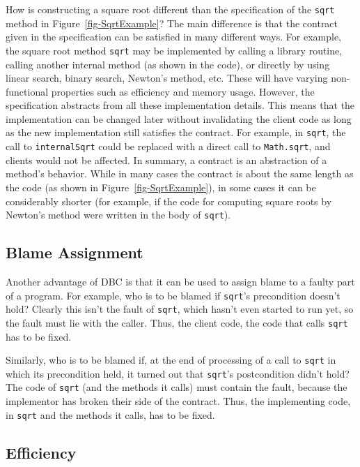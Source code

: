 \documentclass{jotarticle}
\begin{document}

How is constructing a square root different than the specification of
the \texttt{sqrt} method in Figure~\ref{fig-SqrtExample}?
The main difference is that the contract given in the specification
can be satisfied in many different ways. 
For example, the square root method \texttt{sqrt} may be implemented
by calling a library routine, calling another internal method
(as shown in the code), or directly by using linear search, binary
search, Newton's method, etc.  These will have varying non-functional
properties such as efficiency and memory usage.  However, the
specification abstracts from all these 
implementation details. This means that the implementation can
be changed later without invalidating the client code as long as the new
implementation still satisfies the contract.  For example, in
\texttt{sqrt}, the call to \texttt{internalSqrt} could be replaced
with a direct call to \texttt{Math.sqrt}, and clients would not be
affected. In summary, a contract
is an abstraction of a method's behavior.
While in many cases the contract is about the same length as the code
(as shown in Figure~\ref{fig-SqrtExample}),
in some cases it can be considerably shorter (for example, if the code
for computing square roots by Newton's method were written in the body
of \texttt{sqrt}).

\subsection{Blame Assignment}

Another advantage of DBC is that it can be used to assign
blame to a faulty part of a program.  For example, who is to be
blamed if \texttt{sqrt}'s precondition doesn't hold?  Clearly this
isn't the fault of \texttt{sqrt}, which hasn't even started to run
yet, so the fault must lie with the caller.
Thus, the client code, the code that calls \texttt{sqrt} has to be fixed.

Similarly, who is to be blamed if, at the end of processing of a
call to \texttt{sqrt} in which its precondition held,
it turned out that \texttt{sqrt}'s postcondition didn't hold?
The code of \texttt{sqrt} (and the methods it calls)
must contain the fault, because the implementor has broken
their side of the contract. Thus, the implementing code, in
\texttt{sqrt} and the methods it calls, has to be fixed.

\subsection{Efficiency}
\end{document}

